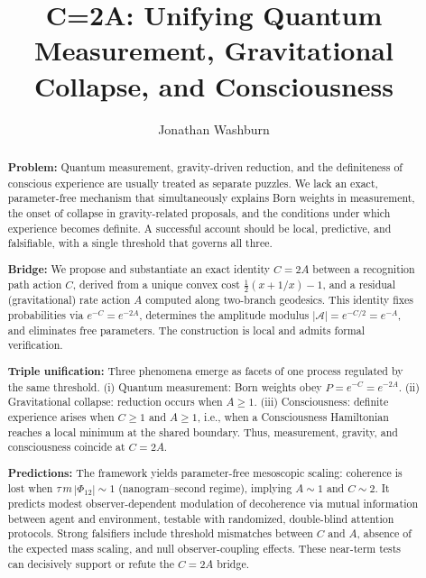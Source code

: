 \documentclass[reprint,aps,prd,nofootinbib]{revtex4-2}
\begin{document}
\title{C=2A: Unifying Quantum Measurement, Gravitational Collapse, and Consciousness}
\author{Jonathan Washburn}

\begin{abstract}
\textbf{Problem:} Quantum measurement, gravity-driven reduction, and the definiteness of conscious experience are usually treated as separate puzzles. We lack an exact, parameter-free mechanism that simultaneously explains Born weights in measurement, the onset of collapse in gravity-related proposals, and the conditions under which experience becomes definite. A successful account should be local, predictive, and falsifiable, with a single threshold that governs all three.

\textbf{Bridge:} We propose and substantiate an exact identity \(C=2A\) between a recognition path action \(C\), derived from a unique convex cost \(\tfrac{1}{2}(x+1/x)-1\), and a residual (gravitational) rate action \(A\) computed along two-branch geodesics. This identity fixes probabilities via \(e^{-C}=e^{-2A}\), determines the amplitude modulus \(|\mathcal{A}|=e^{-C/2}=e^{-A}\), and eliminates free parameters. The construction is local and admits formal verification.

\textbf{Triple unification:} Three phenomena emerge as facets of one process regulated by the same threshold. (i) Quantum measurement: Born weights obey \(P=e^{-C}=e^{-2A}\). (ii) Gravitational collapse: reduction occurs when \(A\ge 1\). (iii) Consciousness: definite experience arises when \(C\ge 1\) and \(A\ge 1\), i.e., when a Consciousness Hamiltonian reaches a local minimum at the shared boundary. Thus, measurement, gravity, and consciousness coincide at \(C=2A\).

\textbf{Predictions:} The framework yields parameter-free mesoscopic scaling: coherence is lost when \(\tau\,m\,|\Phi_{12}|\sim 1\) (nanogram--second regime), implying \(A\sim 1\) and \(C\sim 2\). It predicts modest observer-dependent modulation of decoherence via mutual information between agent and environment, testable with randomized, double-blind attention protocols. Strong falsifiers include threshold mismatches between \(C\) and \(A\), absence of the expected mass scaling, and null observer-coupling effects. These near-term tests can decisively support or refute the \(C=2A\) bridge.
\end{abstract}

\end{document}
